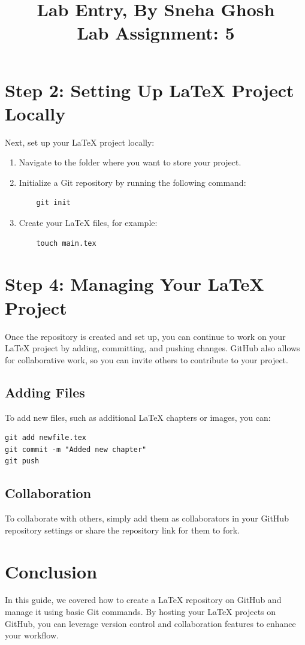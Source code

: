 \documentclass[a4paper,14pt]{article}
\begin{document}
\section{Step 2: Setting Up LaTeX Project Locally}
Next, set up your LaTeX project locally:
\begin{enumerate}
    \item Navigate to the folder where you want to store your project.
    \item Initialize a Git repository by running the following command:
    \begin{verbatim}
    git init
    \end{verbatim}
    \item Create your LaTeX files, for example:
    \begin{verbatim}
    touch main.tex
    \end{verbatim}
\end{enumerate}

\section{Step 4: Managing Your LaTeX Project}
Once the repository is created and set up, you can continue to work on your LaTeX project by adding, committing, and pushing changes. GitHub also allows for collaborative work, so you can invite others to contribute to your project.

\subsection{Adding Files}
To add new files, such as additional LaTeX chapters or images, you can:
\begin{verbatim}
git add newfile.tex
git commit -m "Added new chapter"
git push
\end{verbatim}

\subsection{Collaboration}
To collaborate with others, simply add them as collaborators in your GitHub repository settings or share the repository link for them to fork.

\section{Conclusion}
In this guide, we covered how to create a LaTeX repository on GitHub and manage it using basic Git commands. By hosting your LaTeX projects on GitHub, you can leverage version control and collaboration features to enhance your workflow.
\vspace{420pt}
\begin{center}
\title{Lab Entry, By Sneha Ghosh\\ Lab Assignment: 5}
\end{center}
\end{document}
